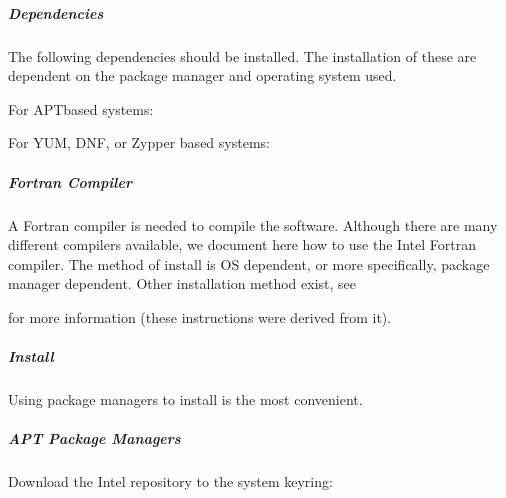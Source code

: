 \documentclass[letterpaper,11pt,english]{sphinxmanual}
\begin{document}
\subparagraph{Dependencies}
\label{\detokenize{technical/installation/orbfit:dependencies}}
\sphinxAtStartPar
The following dependencies should be installed. The installation of these are
dependent on the package manager and operating system used.

\sphinxAtStartPar
For APT\sphinxhyphen{}based systems:

\begin{sphinxVerbatim}[commandchars=\\\{\}]
      
\end{sphinxVerbatim}

\sphinxAtStartPar
For YUM, DNF, or Zypper based systems:

\begin{sphinxVerbatim}[commandchars=\\\{\}]
      
\end{sphinxVerbatim}


\subparagraph{Fortran Compiler}
\label{\detokenize{technical/installation/orbfit:fortran-compiler}}
\sphinxAtStartPar
A Fortran compiler is needed to compile the software. Although there are many
different compilers available, we document here how to use the Intel Fortran
compiler. The method of install is OS dependent, or more specifically, package
manager dependent. Other installation method exist, see
%
\begin{footnote}[37]\sphinxAtStartFootnote
{}
%
\end{footnote} for more information (these instructions were
derived from it).


\subparagraph{Install}
\label{\detokenize{technical/installation/orbfit:install}}
\sphinxAtStartPar
Using package managers to install is the most convenient.


\subparagraph{APT Package Managers}
\label{\detokenize{technical/installation/orbfit:apt-package-managers}}
\sphinxAtStartPar
Download the Intel repository to the system keyring:
\end{document}
